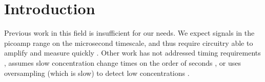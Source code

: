 \chapter{Introduction}

Previous work in this field is insufficient for our needs. We expect signals in the picoamp range on the microsecond timescale, and thus require circuitry able to amplify and measure quickly \cite{mosharok2005aee}. Other work has not addressed timing requirements \cite{zhang2005eam} \cite{steffan2007scp}, assumes slow concentration change times on the order of seconds \cite{murari2005ipn}, or uses oversampling (which is slow) to detect low concentrations \cite{murari2005ipn} \cite{stanacevic2007vpa}.
